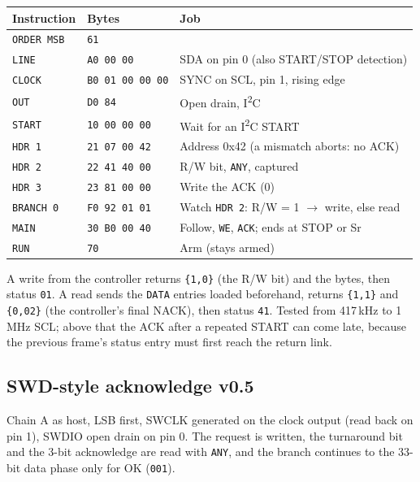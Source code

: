 \documentclass[11pt,a4paper]{article}
\newcommand{\vfive}{\textcolor{fivec}{\textsf{\small v0.5}}}
\newcommand{\sig}[1]{\texttt{#1}}
\begin{document}
\begin{center}
\begin{tabular}{@{}lll@{}}
\toprule
Instruction & Bytes & Job \\
\midrule
\sig{ORDER MSB} & \texttt{61} & \\
\sig{LINE} & \texttt{A0 00 00} & SDA on pin 0 (also START/STOP detection) \\
\sig{CLOCK} & \texttt{B0 01 00 00 00} & SYNC on SCL, pin 1, rising edge \\
\sig{OUT} & \texttt{D0 84} & Open drain, I\textsuperscript{2}C \\
\sig{START} & \texttt{10 00 00 00} & Wait for an I\textsuperscript{2}C START \\
\sig{HDR 1} & \texttt{21 07 00 42} & Address 0x42 (a mismatch aborts: no ACK) \\
\sig{HDR 2} & \texttt{22 41 40 00} & R/W bit, \sig{ANY}, captured \\
\sig{HDR 3} & \texttt{23 81 00 00} & Write the ACK (0) \\
\sig{BRANCH 0} & \texttt{F0 92 01 01} & Watch \sig{HDR 2}: R/W = 1 $\rightarrow$ write, else read \\
\sig{MAIN} & \texttt{30 B0 00 40} & Follow, \sig{WE}, \sig{ACK}; ends at STOP or Sr \\
\sig{RUN} & \texttt{70} & Arm (stays armed) \\
\bottomrule
\end{tabular}
\end{center}

A write from the controller returns \texttt{\{1,0\}} (the R/W bit) and the bytes, then status \texttt{01}. A read sends the \sig{DATA} entries loaded beforehand, returns \texttt{\{1,1\}} and \texttt{\{0,02\}} (the controller's final NACK), then status \texttt{41}. Tested from 417\,kHz to 1\,MHz SCL; above that the ACK after a repeated START can come late, because the previous frame's status entry must first reach the return link.

\subsection{SWD-style acknowledge \vfive}

Chain A as host, LSB first, SWCLK generated on the clock output (read back on pin 1), SWDIO open drain on pin 0. The request is written, the turnaround bit and the 3-bit acknowledge are read with \sig{ANY}, and the branch continues to the 33-bit data phase only for OK (\texttt{001}).
\end{document}
